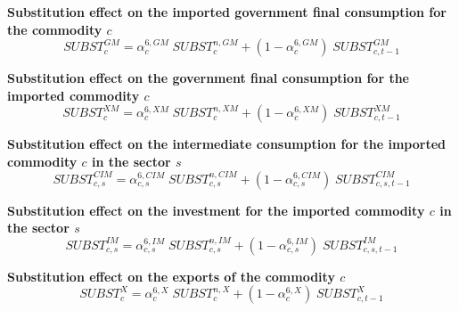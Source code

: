 \documentclass[12pt]{article}
\numberwithin{equation}{section}
\begin{document}
\noindent\textbf{Substitution effect on the imported government final consumption for the commodity $c$} \\
\begin{dmath}
SUBST^{GM}_{c} = \alpha^{{6},GM}_{c} \; SUBST^{n,GM}_{c} + \left( 1 - \alpha^{{6},GM}_{c} \right) \; SUBST^{GM}_{c, t-1}
\end{dmath}

\noindent\textbf{Substitution effect on the government final consumption for the imported commodity $c$} \\
\begin{dmath}
SUBST^{XM}_{c} = \alpha^{{6},XM}_{c} \; SUBST^{n,XM}_{c} + \left( 1 - \alpha^{{6},XM}_{c} \right) \; SUBST^{XM}_{c, t-1}
\end{dmath}

\noindent\textbf{Substitution effect on the intermediate consumption for the imported commodity $c$ in the sector $s$} \\
\begin{dmath}
SUBST^{CIM}_{c, s} = \alpha^{{6},CIM}_{c, s} \; SUBST^{n,CIM}_{c, s} + \left( 1 - \alpha^{{6},CIM}_{c, s} \right) \; SUBST^{CIM}_{c, s, t-1}
\end{dmath}

\noindent\textbf{Substitution effect on the investment for the imported commodity $c$ in the sector $s$} \\
\begin{dmath}
SUBST^{IM}_{c, s} = \alpha^{{6},IM}_{c, s} \; SUBST^{n,IM}_{c, s} + \left( 1 - \alpha^{{6},IM}_{c, s} \right) \; SUBST^{IM}_{c, s, t-1}
\end{dmath}

\noindent\textbf{Substitution effect on the exports of the commodity $c$} \\
\begin{dmath}
SUBST^{X}_{c} = \alpha^{{6},X}_{c} \; SUBST^{n,X}_{c} + \left( 1 - \alpha^{{6},X}_{c} \right) \; SUBST^{X}_{c, t-1}
\end{dmath}
\newpage
\end{document}
